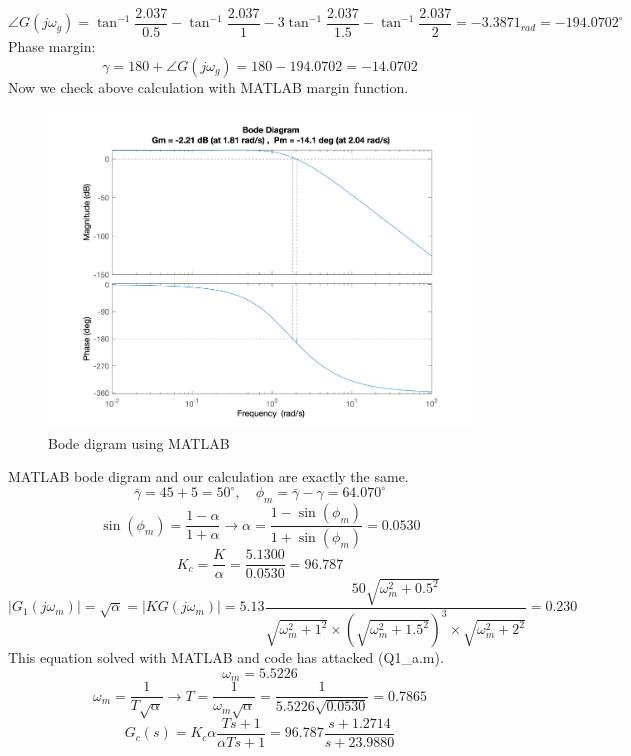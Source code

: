 $$
\angle G(j\omega_g) = \tan^{-1}\dfrac{2.037}{0.5} - \tan^{-1}\dfrac{2.037}{1} - 3\tan^{-1}\dfrac{2.037}{1.5} - \tan^{-1}\dfrac{2.037}{2} = -3.3871_{rad} = -194.0702^{\circ}
$$
Phase margin:
$$
\gamma = 180 + \angle G(j\omega_g) = 180 - 194.0702 = -14.0702
$$
Now we check above calculation with MATLAB margin function.
\begin{figure}[H]
	\caption{Bode digram using MATLAB}
	\centering
	\includegraphics[width=12cm]{../Figure/Q1/a/margin.png}
\end{figure}
MATLAB bode digram and our calculation are exactly the same.
$$
\bar{\gamma} = 45 + 5 = 50^{\circ},\quad \phi_m = \bar{\gamma} - \gamma = 64.070^{\circ}
$$
$$
\sin(\phi_m) = \dfrac{1-\alpha}{1+\alpha} \to
\alpha = \dfrac{1-\sin(\phi_m) }{1+\sin(\phi_m) } = 0.0530
$$
$$
K_c = \dfrac{K}{\alpha} = \dfrac{5.1300}{0.0530} = 96.787
$$
$$
\left\vert G_1(j\omega_m) \right\vert = \sqrt{\alpha} = \left\vert KG(j\omega_m) \right\vert = 5.13 \dfrac{50\sqrt{\omega_m^2+0.5^2}}{\sqrt{\omega_m^2+1^2}\times(\sqrt{\omega_m^2 + 1.5^2})^3\times\sqrt{\omega_m^2 + 2^2}} = 0.230
$$
This equation solved with MATLAB and code has attacked (Q1\_a.m).
$$
\omega_m = 5.5226
$$
$$
\omega_m = \dfrac{1}{T\sqrt{\alpha}} \to
T = \dfrac{1}{\omega_m\sqrt{\alpha}} = \dfrac{1}{5.5226\sqrt{0.0530}} = 0.7865
$$
$$
G_c(s) = K_c \alpha \dfrac{Ts + 1}{\alpha T s + 1} = 96.787\dfrac{s + 1.2714}{s + 23.9880}
$$